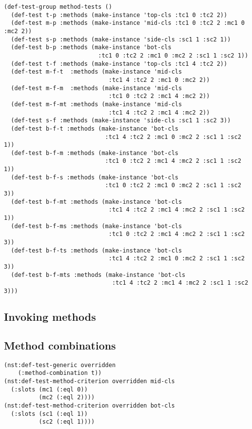 \begin{verbatim}
(def-test-group method-tests ()
  (def-test t-p :methods (make-instance 'top-cls :tc1 0 :tc2 2))
  (def-test m-p :methods (make-instance 'mid-cls :tc1 0 :tc2 2 :mc1 0 :mc2 2))
  (def-test s-p :methods (make-instance 'side-cls :sc1 1 :sc2 1))
  (def-test b-p :methods (make-instance 'bot-cls
                           :tc1 0 :tc2 2 :mc1 0 :mc2 2 :sc1 1 :sc2 1))
  (def-test t-f :methods (make-instance 'top-cls :tc1 4 :tc2 2))
  (def-test m-f-t  :methods (make-instance 'mid-cls
                              :tc1 4 :tc2 2 :mc1 0 :mc2 2))
  (def-test m-f-m  :methods (make-instance 'mid-cls
                              :tc1 0 :tc2 2 :mc1 4 :mc2 2))
  (def-test m-f-mt :methods (make-instance 'mid-cls
                              :tc1 4 :tc2 2 :mc1 4 :mc2 2))
  (def-test s-f :methods (make-instance 'side-cls :sc1 1 :sc2 3))
  (def-test b-f-t :methods (make-instance 'bot-cls
                             :tc1 4 :tc2 2 :mc1 0 :mc2 2 :sc1 1 :sc2 1))
  (def-test b-f-m :methods (make-instance 'bot-cls
                             :tc1 0 :tc2 2 :mc1 4 :mc2 2 :sc1 1 :sc2 1))
  (def-test b-f-s :methods (make-instance 'bot-cls
                             :tc1 0 :tc2 2 :mc1 0 :mc2 2 :sc1 1 :sc2 3))
  (def-test b-f-mt :methods (make-instance 'bot-cls
                              :tc1 4 :tc2 2 :mc1 4 :mc2 2 :sc1 1 :sc2 1))
  (def-test b-f-ms :methods (make-instance 'bot-cls
                              :tc1 0 :tc2 2 :mc1 4 :mc2 2 :sc1 1 :sc2 3))
  (def-test b-f-ts :methods (make-instance 'bot-cls
                              :tc1 4 :tc2 2 :mc1 0 :mc2 2 :sc1 1 :sc2 3))
  (def-test b-f-mts :methods (make-instance 'bot-cls
                               :tc1 4 :tc2 2 :mc1 4 :mc2 2 :sc1 1 :sc2 3)))
\end{verbatim}

\subsection{Invoking methods}

\subsection{Method combinations}

\begin{verbatim}
(nst:def-test-generic overridden
    (:method-combination t))
(nst:def-test-method-criterion overridden mid-cls
  (:slots (mc1 (:eql 0))
          (mc2 (:eql 2))))
(nst:def-test-method-criterion overridden bot-cls
  (:slots (sc1 (:eql 1))
          (sc2 (:eql 1))))
\end{verbatim}


